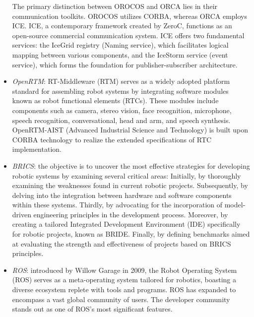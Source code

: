 \begin{itemize}
        The primary distinction between OROCOS and ORCA lies in their communication toolkits. OROCOS utilizes CORBA, whereas ORCA employs ICE. 
        ICE, a contemporary framework created by ZeroC, functions as an open-source commercial communication system. 
        ICE offers two fundamental services: the IceGrid registry (Naming service), which facilitates logical mapping between various components, and the IceStorm service (event service), which forms the foundation for publisher-subscriber architecture.
    \item \textit{OpenRTM}: RT-Middleware (RTM) serves as a widely adopted platform standard for assembling robot systems by integrating software modules known as robot functional elements (RTCs). 
        These modules include components such as camera, stereo vision, face recognition, microphone, speech recognition, conversational, head and arm, and speech synthesis. 
        OpenRTM-AIST (Advanced Industrial Science and Technology) is built upon CORBA technology to realize the extended specifications of RTC implementation.
    \item \textit{BRICS}: the objective is to uncover the most effective strategies for developing robotic systems by examining several critical areas:
        Initially, by thoroughly examining the weaknesses found in current robotic projects.    
        Subsequently, by delving into the integration between hardware and software components within these systems.    
        Thirdly, by advocating for the incorporation of model-driven engineering principles in the development process.    
        Moreover, by creating a tailored Integrated Development Environment (IDE) specifically for robotic projects, known as BRIDE.    
        Finally, by defining benchmarks aimed at evaluating the strength and effectiveness of projects based on BRICS principles.
    \item \textit{ROS}: introduced by Willow Garage in 2009, the Robot Operating System (ROS) serves as a meta-operating system tailored for robotics, boasting a diverse ecosystem replete with tools and programs.
        ROS has expanded to encompass a vast global community of users. 
        The developer community stands out as one of ROS's most significant features.
\end{itemize}  